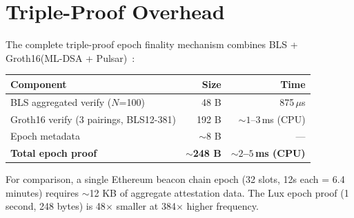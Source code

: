 \section{Triple-Proof Overhead}


The complete triple-proof epoch finality mechanism combines BLS + Groth16(ML-DSA + Pulsar)~\cite{lux-benchmarks}:

\begin{center}
\begin{tabular}{lrr}
\toprule
\textbf{Component} & \textbf{Size} & \textbf{Time} \\
\midrule
BLS aggregated verify ($N$=100) & 48 B & 875\,$\mu$s \\
Groth16 verify (3 pairings, BLS12-381) & 192 B & ${\sim}1$--$3$\,ms (CPU) \\
Epoch metadata & $\sim$8 B & --- \\
\midrule
\textbf{Total epoch proof} & \textbf{$\sim$248 B} & \textbf{${\sim}2$--$5$\,ms (CPU)} \\
\bottomrule
\end{tabular}
\end{center}

For comparison, a single Ethereum beacon chain epoch (32 slots, 12s each = 6.4 minutes) requires $\sim$12 KB of aggregate attestation data. The Lux epoch proof (1 second, 248 bytes) is 48$\times$ smaller at 384$\times$ higher frequency.

